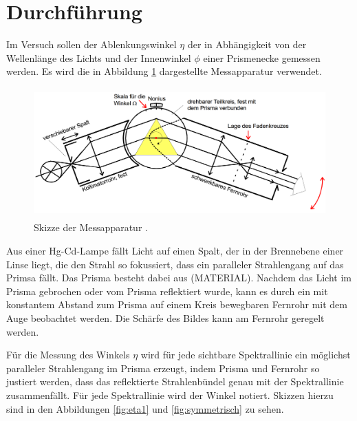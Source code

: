 \section{Durchführung}
\label{sec:Durchführung}
Im Versuch sollen der Ablenkungswinkel $\eta$ der in Abhängigkeit von der Wellenlänge
des Lichts und der Innenwinkel $\phi$ einer Prismenecke gemessen werden. Es wird
die in Abbildung \ref{fig:geraet} dargestellte Messapparatur verwendet.

\begin{figure}[H]
  \centering
  \includegraphics[height=5cm]{data/aufbau.png}
  \caption{Skizze der Messapparatur \cite{Versuchsanleitung}.}
  \label{fig:geraet}
\end{figure}

Aus einer Hg-Cd-Lampe fällt Licht auf einen Spalt, der in der Brennebene einer Linse
liegt, die den Strahl so fokussiert, dass ein paralleler Strahlengang auf das Primsa fällt.
Das Prisma besteht dabei aus (MATERIAL). Nachdem das Licht im Prisma gebrochen oder vom
Prisma reflektiert wurde, kann es durch ein mit konstantem Abstand zum Prisma auf
einem Kreis bewegbaren Fernrohr mit dem Auge beobachtet werden. Die Schärfe des Bildes
kann am Fernrohr geregelt werden.

Für die Messung des Winkels $\eta$ wird für jede sichtbare Spektrallinie ein möglichst
paralleler Strahlengang im Prisma erzeugt, indem Prisma und Fernrohr so justiert werden,
dass das reflektierte Strahlenbündel genau mit der Spektrallinie zusammenfällt.
Für jede Spektrallinie wird der Winkel notiert. Skizzen hierzu sind in den Abbildungen
\ref{fig:eta1} und \ref{fig:symmetrisch} zu sehen.

